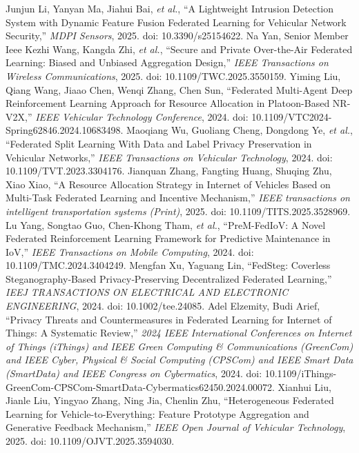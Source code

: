  Junjun Li, Yanyan Ma, Jiahui Bai, \emph{et al.}, ``A Lightweight Intrusion Detection System with Dynamic Feature Fusion Federated Learning for Vehicular Network Security,'' \emph{MDPI Sensors}, 2025. doi: 10.3390/s25154622.
 Na Yan, Senior Member Ieee Kezhi Wang, Kangda Zhi, \emph{et al.}, ``Secure and Private Over-the-Air Federated Learning: Biased and Unbiased Aggregation Design,'' \emph{IEEE Transactions on Wireless Communications}, 2025. doi: 10.1109/TWC.2025.3550159.
 Yiming Liu, Qiang Wang, Jiaao Chen, Wenqi Zhang, Chen Sun, ``Federated Multi-Agent Deep Reinforcement Learning Approach for Resource Allocation in Platoon-Based NR-V2X,'' \emph{IEEE Vehicular Technology Conference}, 2024. doi: 10.1109/VTC2024-Spring62846.2024.10683498.
 Maoqiang Wu, Guoliang Cheng, Dongdong Ye, \emph{et al.}, ``Federated Split Learning With Data and Label Privacy Preservation in Vehicular Networks,'' \emph{IEEE Transactions on Vehicular Technology}, 2024. doi: 10.1109/TVT.2023.3304176.
 Jianquan Zhang, Fangting Huang, Shuqing Zhu, Xiao Xiao, ``A Resource Allocation Strategy in Internet of Vehicles Based on Multi-Task Federated Learning and Incentive Mechanism,'' \emph{IEEE transactions on intelligent transportation systems (Print)}, 2025. doi: 10.1109/TITS.2025.3528969.
 Lu Yang, Songtao Guo, Chen-Khong Tham, \emph{et al.}, ``PreM-FedIoV: A Novel Federated Reinforcement Learning Framework for Predictive Maintenance in IoV,'' \emph{IEEE Transactions on Mobile Computing}, 2024. doi: 10.1109/TMC.2024.3404249.
 Mengfan Xu, Yaguang Lin, ``FedSteg: Coverless Steganography‐Based Privacy‐Preserving Decentralized Federated Learning,'' \emph{IEEJ TRANSACTIONS ON ELECTRICAL AND ELECTRONIC ENGINEERING}, 2024. doi: 10.1002/tee.24085.
 Adel Elzemity, Budi Arief, ``Privacy Threats and Countermeasures in Federated Learning for Internet of Things: A Systematic Review,'' \emph{2024 IEEE International Conferences on Internet of Things (iThings) and IEEE Green Computing & Communications (GreenCom) and IEEE Cyber, Physical & Social Computing (CPSCom) and IEEE Smart Data (SmartData) and IEEE Congress on Cybermatics}, 2024. doi: 10.1109/iThings-GreenCom-CPSCom-SmartData-Cybermatics62450.2024.00072.
 Xianhui Liu, Jianle Liu, Yingyao Zhang, Ning Jia, Chenlin Zhu, ``Heterogeneous Federated Learning for Vehicle-to-Everything: Feature Prototype Aggregation and Generative Feedback Mechanism,'' \emph{IEEE Open Journal of Vehicular Technology}, 2025. doi: 10.1109/OJVT.2025.3594030.
